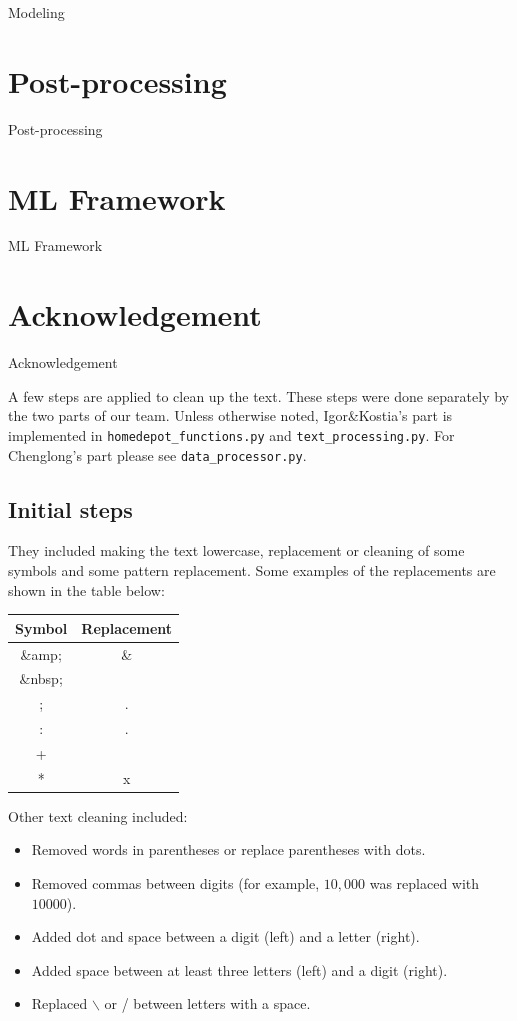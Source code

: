 \documentclass[12pt]{article}
\begin{document}
Modeling

\section{Post-processing}

Post-processing

\section{ML Framework}

ML Framework

\section{Acknowledgement}

Acknowledgement

A few steps are applied to clean up the text. These steps were done separately by the two parts of our team. Unless otherwise noted, Igor\&Kostia's part is implemented in \texttt{homedepot\_functions.py} and  \texttt{text\_processing.py}. For Chenglong's part please see \texttt{data\_processor.py}.

\subsection{Initial steps}
They included making the text lowercase, replacement or cleaning of some symbols and some pattern replacement.
Some examples of the replacements are shown in the table below:

\begin{tabular}{|c|c|}
  \hline
  Symbol & Replacement \\ \hline
  \&amp; & \& \\ \hline
 \&nbsp; &  \\ \hline
  ; & . \\ \hline
: & . \\ \hline
+ &  \\ \hline
* &  x \\ \hline
\end{tabular}

Other text cleaning included:
\begin{itemize}
\item Removed words in parentheses or replace parentheses with dots.
\item Removed commas between digits (for example, $10,000$ was replaced with $10000$).
\item Added dot and space between a digit (left) and a letter (right).
\item Added space between at least three letters (left) and a digit (right).
\item Replaced  $\backslash$ or / between letters with a space.
\end{itemize}
\end{document}
